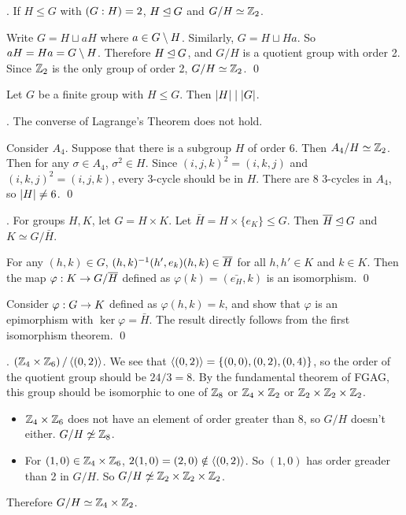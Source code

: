 \thm. If \(H \leq G\) with \(\left(G : H\right) = 2\), \(H \unlhd G\) and \(G/H \simeq \mathbb{Z}_2\).

\pf Write \(G = H \sqcup aH\) where \(a \in G \setminus H\). Similarly, \(G = H \sqcup Ha\). So \(aH = Ha = G \setminus H\). Therefore \(H \unlhd G\), and \(G/H\) is a quotient group with order 2. Since \(\mathbb{Z}_2\) is the only group of order 2, \(G/H \simeq \mathbb{Z}_2\). \qed

\recall {} Let \(G\) be a finite group with \(H \leq G\). Then \(\left| H \right| \mid \left| G \right|\).

\prop. The converse of Lagrange's Theorem does not hold.

\pf Consider \(A_4\). Suppose that there is a subgroup \(H\) of order 6. Then \(A_4 / H \simeq \mathbb{Z}_2\). Then for any \(\sigma \in A_4\), \(\sigma^2 \in H\). Since \((i, j, k)^2 = (i, k, j)\) and \((i, k, j)^2 = (i, j, k)\), every 3-cycle should be in \(H\). There are 8 3-cycles in \(A_4\), so \(\left| H \right| \neq 6\). \qed

\thm. For groups \(H, K\), let \(G = H \times K\). Let \(\bar{H} = H \times \{e_K\} \leq G\). Then \(\bar{H} \nsub G\) and \(K \simeq G/\bar{H}\).

\pf {} For any \((h, k) \in G\), \((h, k)\inv(h', e_k)(h, k) \in \bar{H}\) for all \(h, h' \in K\) and \(k \in K\). Then the map \(\varphi: K \ra G/\bar{H}\) defined as \(\varphi(k) = (\bar{e_H}, k)\) is an isomorphism. \qed

 Consider \(\varphi : G \rightarrow K\) defined as \(\varphi(h, k) = k\), and show that \(\varphi\) is an epimorphism with \(\ker \varphi = \bar{H}\). The result directly follows from the first isomorphism theorem. \qed

\ex. \((\mathbb{Z}_4 \times \mathbb{Z}_6) \operatorname{/} \left\langle (0, 2) \right\rangle\). We see that \(\left\langle (0, 2) \right\rangle = \{(0, 0), (0, 2), (0, 4)\}\), so the order of the quotient group should be \(24/3 = 8\). By the fundamental theorem of FGAG, this group should be isomorphic to one of \(\mathbb{Z}_8\) or \(\mathbb{Z}_4 \times \mathbb{Z}_2\) or \(\mathbb{Z}_2 \times \mathbb{Z}_2 \times \mathbb{Z}_2\).
\begin{itemize}
    \item \(\mathbb{Z}_4 \times \mathbb{Z}_6\) does not have an element of order greater than 8, so \(G/H\) doesn't either. \(G/H \not\simeq \mathbb{Z}_8\).
    \item For \((1, 0) \in \mathbb{Z}_4 \times \mathbb{Z}_6\), \(2(1, 0) = (2, 0) \notin \left\langle (0, 2) \right\rangle\). So \((1, 0)\) has order greader than 2 in \(G/H\). So \(G/H \not\simeq \mathbb{Z}_2 \times \mathbb{Z}_2 \times \mathbb{Z}_2\).
\end{itemize}
Therefore \(G/H \simeq \mathbb{Z}_4 \times \mathbb{Z}_2\).

